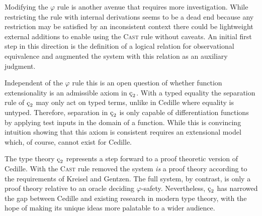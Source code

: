 Modifying the $\varphi$ rule is another avenue that requires more investigation.
While restricting the rule with internal derivations seems to be a dead end because any restriction may be satisfied by an inconsistent context there could be lightweight external additions to enable using the \textsc{Cast} rule without caveats.
An initial first step in this direction is the definition of a logical relation for observational equivalence and augmented the system with this relation as an auxiliary judgment.

Independent of the $\varphi$ rule this is an open question of whether function extensionality is an admissible axiom in $\ced$.
With a typed equality the separation rule of $\ced$ may only act on typed terms, unlike in Cedille where equality is untyped.
Therefore, separation in $\ced$ is only capable of differentiation functions by applying test inputs in the domain of a function.
While this is convincing intuition showing that this axiom is consistent requires an extensional model which, of course, cannot exist for Cedille.

The type theory $\ced$ represents a step forward to a proof theoretic version of Cedille.
With the \textsc{Cast} rule removed the system \textit{is} a proof theory according to the requirements of Kreisel and Gentzen.
The full system, by contrast, is only a proof theory relative to an oracle deciding $\varphi$-safety.
Nevertheless, $\ced$ has narrowed the gap between Cedille and existing research in modern type theory, with the hope of making its unique ideas more palatable to a wider audience.
